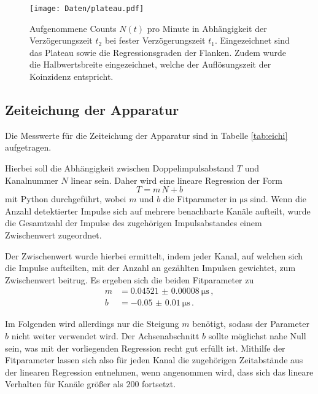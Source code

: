 
\begin{figure}
  \centering
  \texttt{[image: Daten/plateau.pdf]}
	\caption{Aufgenommene Counts $N(t)$ pro Minute in Abhängigkeit der Verzögerungszeit $t_2$ bei fester Verzögerungszeit $t_1$. Eingezeichnet sind das Plateau sowie die Regressionsgraden der Flanken. Zudem wurde die Halbwertsbreite eingezeichnet, welche der Auflösungszeit der Koinzidenz entspricht.}
  \label{fig:plateau}
\end{figure}


\FloatBarrier
\subsection{Zeiteichung der Apparatur}
\label{sec:blaaaaaaa}
Die Messwerte für die Zeiteichung der Apparatur sind in Tabelle
\ref{tab:eichi} aufgetragen.

Hierbei soll die Abhängigkeit zwischen Doppelimpulsabstand $T$ und Kanalnummer $N$ linear sein.
Daher wird eine lineare Regression der Form
\begin{equation}
	T = m \, N + b
\end{equation}
mit Python \cite{numpy} durchgeführt, wobei $m$ und $b$ die Fitparameter in $\si{\micro\second}$
sind.
Wenn die Anzahl detektierter Impulse sich auf mehrere benachbarte Kanäle aufteilt, wurde die Gesamtzahl der Impulse des zugehörigen Impulsabstandes einem Zwischenwert zugeordnet.

Der Zwischenwert wurde hierbei ermittelt, indem jeder Kanal, auf welchen sich die Impulse aufteilten, mit der Anzahl an gezählten Impulsen gewichtet, zum Zwischenwert beitrug.
Es ergeben sich die beiden Fitparameter zu
\begin{equation*}
	\begin{split}
		m &= \SI{0.04521(8)}{\micro\second} \, \mathrm{,} \\
		b &= \SI{-0.05(1)}{\micro\second} \, \mathrm{.}
	\end{split}
\end{equation*}

Im Folgenden wird allerdings nur die Steigung $m$ benötigt, sodass der Parameter $b$ nicht weiter
verwendet wird. Der Achsenabschnitt $b$ sollte möglichst nahe Null sein, was mit der vorliegenden Regression recht gut erfüllt ist.
Mithilfe der Fitparameter lassen sich also für jeden Kanal die zugehörigen Zeitabstände aus der linearen Regression entnehmen, wenn angenommen wird, dass sich das lineare Verhalten für Kanäle größer als $\num{200}$ fortsetzt.

